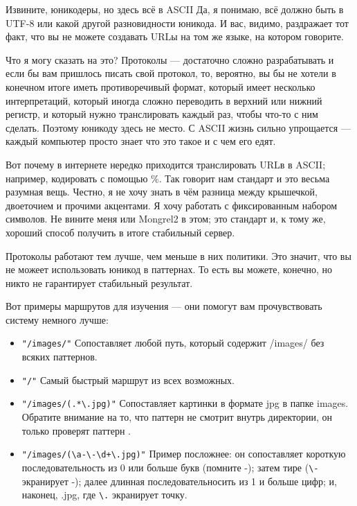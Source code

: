 \begin{aside}{Извините, юникодеры, но здесь всё в ASCII}
Да, я понимаю, всё должно быть в UTF-8 или какой другой разновидности
юникода. И вас, видимо, раздражает тот факт, что вы не можете
создавать URLы на том же языке, на котором говорите.

Что я могу сказать на это? Протоколы --- достаточно сложно
разрабатывать и если бы вам пришлось писать свой протокол, то,
вероятно, вы бы не хотели в конечном итоге иметь противоречивый
формат, который имеет несколько интерпретаций, который иногда сложно
переводить в верхний или нижний регистр, и который нужно транслировать
каждый раз, чтобы что-то с ним сделать. Поэтому юникоду здесь не
место. С ASCII жизнь сильно упрощается --- каждый компьютер просто
знает что это такое и с чем его едят.

Вот почему в интернете нередко приходится транслировать URLв в ASCII;
например, кодировать с помощью \%. Так говорит нам стандарт и это
весьма разумная вещь. Честно, я не хочу знать в чём разница между
крышечкой, двоеточием и прочими акцентами. Я хочу работать с
фиксированным набором символов. Не вините меня или Mongrel2 в этом;
это стандарт и, к тому же, хороший способ получить в итоге стабильный
сервер.

Протоколы работают тем лучше, чем меньше в них политики. Это значит,
что вы не можеет использовать юникод в паттернах. То есть вы можете,
конечно, но никто не гарантирует стабильный результат.

\end{aside}

Вот примеры маршрутов для изучения --- они помогут вам прочувствовать
систему немного лучше:

\begin{itemize}
\item \verb|"/images/"|  Сопоставляет любой путь, который содержит
/images/ без всяких паттернов.
\item \verb|"/"| Самый быстрый маршрут из всех возможных.
\item \verb|"/images/(.*\.jpg)"| Сопоставляет картинки в формате jpg в
папке images. Обратите внимание на то, что паттерн не смотрит внутрь
директории, он только проверят паттерн .
\item \verb|"/images/(\a-\-\d+\.jpg)"| Пример посложнее: он
сопоставляет короткую последовательность из 0 или больше букв (помните
-); затем тире (\verb|\-| экранирует -); далее длинная
последовательносить из 1 и больше цифр; и, наконец, .jpg, где
\verb|\.| экранирует точку.
\end{itemize}

